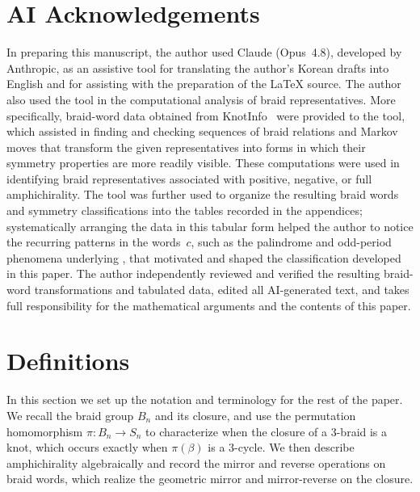 \documentclass[11pt]{article}
\theoremstyle{definition}
\begin{document}
\section*{AI Acknowledgements}
In preparing this manuscript, the author used Claude (Opus~4.8), developed by Anthropic, as an assistive tool for translating the author's Korean drafts into English and for assisting with the preparation of the \LaTeX{} source. The author also used the tool in the computational analysis of braid representatives. More specifically, braid-word data obtained from KnotInfo~\cite{knotinfo} were provided to the tool, which assisted in finding and checking sequences of braid relations and Markov moves that transform the given representatives into forms in which their symmetry properties are more readily visible. These computations were used in identifying braid representatives associated with positive, negative, or full amphichirality. The tool was further used to organize the resulting braid words and symmetry classifications into the tables recorded in the appendices; systematically arranging the data in this tabular form helped the author to notice the recurring patterns in the words~$c$, such as the palindrome and odd-period phenomena underlying , that motivated and shaped the classification developed in this paper. The author independently reviewed and verified the resulting braid-word transformations and tabulated data, edited all AI-generated text, and takes full responsibility for the mathematical arguments and the contents of this paper.

\section{Definitions}\label{sec:def}
\noindent In this section we set up the notation and terminology for the rest of
the paper. We recall the braid group $B_n$ and its closure, and use the
permutation homomorphism $\pi\colon B_n\to S_n$ to characterize when the closure
of a $3$-braid is a knot, which occurs exactly when $\pi(\beta)$ is a $3$-cycle. We then
describe amphichirality algebraically and record the mirror and reverse
operations on braid words, which realize the geometric mirror and mirror-reverse
on the closure.
\end{document}

